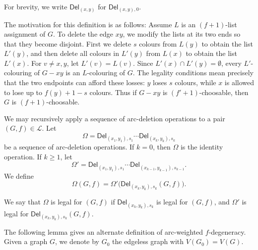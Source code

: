 \documentclass[11pt,a4paper]{article}
\theoremstyle{definition}
\newcommand{\ed}{\textsf{Del}}
\begin{document}
 For brevity, we write $\ed_{(x,y)}$ for $\ed_{(x,y), 0}$. 

 The motivation for this definition is as follows: Assume $L$ is an $(f+1)$-list assignment of $G$. To delete the edge $xy$, we modify the lists at its two ends so that they become disjoint. First we delete $s$ colours from $L(y)$ to obtain the list $L'(y)$, and then delete all colours in $L'(y)$ from $L(x)$ to obtain the list $L'(x)$. For $v \ne x,y$, let $L'(v)=L(v)$.  
Since $L'(x)\cap L'(y)=\emptyset$, every $L'$-colouring of $G-xy$ is an $L$-colouring of $G$. The legality conditions mean precisely that the two endpoints can afford these losses: $y$ loses $s$ colours, while $x$ is allowed to lose up to $f(y)+1-s$ colours.
Thus if $G-xy$ is $(f'+1)$-choosable, then $G$ is $(f+1)$-choosable.  


 We may recursively apply a sequence of arc-deletion operations to a pair $(G,f) \in \mathcal{L}$. Let
   $$ \Omega=\ed_{(x_1,y_1),s_1}\cdots \ed_{(x_k,y_k),s_k}$$
be a sequence of arc-deletion operations. If $k=0$, then $\Omega$ is the
identity operation. If $k\ge 1$, let
    $$\Omega'=\ed_{(x_1,y_1),s_1}\cdots
    \ed_{(x_{k-1},y_{k-1}),s_{k-1}}.$$
We define
$$ \Omega(G,f)=\Omega'\bigl(\ed_{(x_k,y_k),s_k}(G,f)\bigr).$$ 


We say that $\Omega$ is legal for $(G,f)$ if
$\ed_{(x_k,y_k),s_k}$ is legal for $(G,f)$, and $\Omega'$ is legal for $\ed_{(x_k,y_k),s_k}(G,f)$.

The following lemma gives an alternate definition of arc-weighted $f$-degeneracy. Given a graph $G$, we denote by $G_0$ the edgeless graph with $V(G_0)=V(G)$.  
\end{document}
